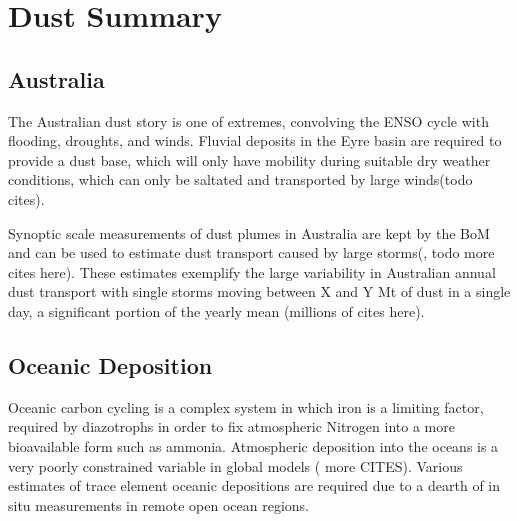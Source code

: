 \section{Dust Summary}

\subsection{Australia}

The Australian dust story is one of extremes, convolving the ENSO cycle with flooding, droughts, and winds. Fluvial deposits in the Eyre basin are required to provide a dust base, which will only have mobility during suitable dry weather conditions, which can only be saltated and transported by large winds(todo cites).

Synoptic scale measurements of dust plumes in Australia are kept by the BoM and can be used to estimate dust transport caused by large storms(\cite{Leys_2011}, todo more cites here). These estimates exemplify the large variability in Australian annual dust transport with single storms moving between X and Y Mt of dust in a single day, a significant portion of the yearly mean (millions of cites here).

\subsection{Oceanic Deposition}
Oceanic carbon cycling is a complex system in which iron is a limiting factor, required by diazotrophs in order to fix atmospheric Nitrogen into a more bioavailable form such as ammonia. Atmospheric deposition into the oceans is a very poorly constrained variable in global models (\cite{Grand_2015} more CITES). Various estimates of trace element oceanic depositions are required due to a dearth of in situ measurements in remote open ocean regions.